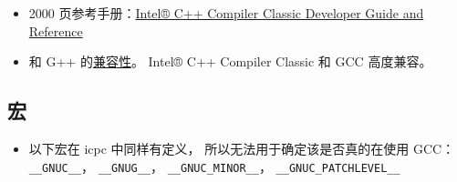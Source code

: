 
\begin{issues}
\issueDraft
\end{issues}

\begin{itemize}
\item 2000 页参考手册：\href{https://www.intel.com/content/www/us/en/develop/documentation/cpp-compiler-developer-guide-and-reference/top.html}{Intel® C++ Compiler Classic Developer Guide and Reference}
\item 和 G++ 的\href{https://www.intel.com/content/www/us/en/develop/documentation/cpp-compiler-developer-guide-and-reference/top/compatibility-and-portability/gcc-compatibility-and-interoperability.html}{兼容性}。 Intel® C++ Compiler Classic 和 GCC 高度兼容。
\end{itemize}

\subsection{宏}
\begin{itemize}
\item 以下宏在 icpc 中同样有定义， 所以无法用于确定该是否真的在使用 GCC： \verb|__GNUC__|， \verb|__GNUG__|， \verb|__GNUC_MINOR__|， \verb|__GNUC_PATCHLEVEL__|
\end{itemize}

